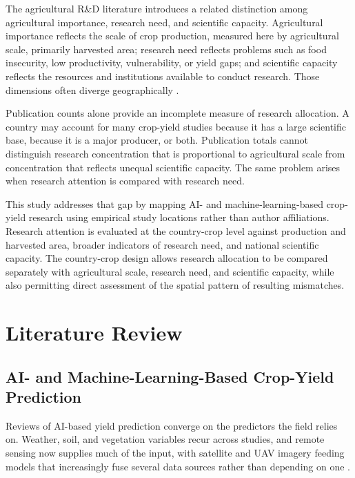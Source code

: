 \documentclass[ASNA,twocolumn]{USG}
\begin{document}
The agricultural R\&D literature introduces a related distinction among agricultural importance,
research need, and scientific capacity. Agricultural importance reflects the scale of crop
production, measured here by agricultural scale, primarily harvested area; research need reflects problems such as food insecurity, low productivity,
vulnerability, or yield gaps; and scientific capacity reflects the resources and institutions
available to conduct research. Those dimensions often diverge geographically
\cite{NinPratt2021,NinPratt2023,Rosegrant2023,vanDijk2025}.

Publication counts alone provide an incomplete measure of research allocation. A
country may account for many crop-yield studies because it has a large scientific base,
because it is a major producer, or both. Publication totals cannot distinguish research
concentration that is proportional to agricultural scale from concentration that
reflects unequal scientific capacity. The same problem arises when research attention is
compared with research need.

This study addresses that gap by mapping AI- and machine-learning-based crop-yield research
using empirical study locations rather than author affiliations. Research attention is
evaluated at the country-crop level against production and harvested area, broader indicators
of research need, and national scientific capacity. The country-crop design allows research
allocation to be compared separately with agricultural scale, research need, and
scientific capacity, while also permitting direct assessment of the spatial pattern of
resulting mismatches.

\section{Literature Review}

\subsection{AI- and Machine-Learning-Based Crop-Yield Prediction}

Reviews of AI-based yield prediction converge on the predictors the field relies on. Weather,
soil, and vegetation variables recur across studies, and remote sensing now supplies much of
the input, with satellite and UAV imagery feeding models that increasingly fuse several data
sources rather than depending on one \cite{vanKlompenburg2020,Joshi2023,Muruganantham2022,Shawon2025}.
\end{document}
